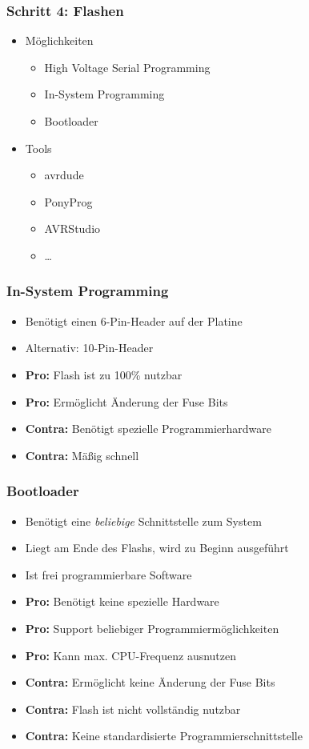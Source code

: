 \documentclass{beamer}
\begin{document}
\begin{frame}
\frametitle{Schritt 4: Flashen}
\begin{itemize}
\item Möglichkeiten
    \begin{itemize}
    \item High Voltage Serial Programming 
    \item In-System Programming
    \item Bootloader
    \end{itemize}
\item Tools
    \begin{itemize}
    \item avrdude
    \item PonyProg
    \item AVRStudio
    \item  …
    \end{itemize}
\end{itemize}
\end{frame}

\begin{frame}
\frametitle{In-System Programming}
\begin{itemize}
\item Benötigt einen 6-Pin-Header auf der Platine
\item Alternativ: 10-Pin-Header
\item \textbf{Pro:} Flash ist zu 100\% nutzbar
\item \textbf{Pro:} Ermöglicht Änderung der Fuse Bits
\item \textbf{Contra:} Benötigt spezielle Programmierhardware
\item \textbf{Contra:} Mäßig schnell
\end{itemize}
\end{frame}

\begin{frame}
\frametitle{Bootloader}
\begin{itemize}
\item Benötigt eine \textit{beliebige} Schnittstelle zum System
\item Liegt am Ende des Flashs, wird zu Beginn ausgeführt
\item Ist frei programmierbare Software
\item \textbf{Pro:} Benötigt keine spezielle Hardware
\item \textbf{Pro:} Support beliebiger Programmiermöglichkeiten
\item \textbf{Pro:} Kann max. CPU-Frequenz ausnutzen
\item \textbf{Contra:} Ermöglicht keine Änderung der Fuse Bits
\item \textbf{Contra:} Flash ist nicht vollständig nutzbar
\item \textbf{Contra:} Keine standardisierte Programmierschnittstelle
\end{itemize}
\end{frame}
\end{document}
